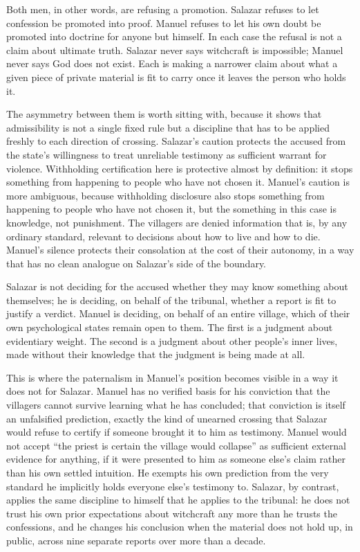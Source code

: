 \documentclass[12pt]{article}
\begin{document}
Both men, in other words, are refusing a promotion. Salazar refuses to let confession be promoted into proof. Manuel refuses to let his own doubt be promoted into doctrine for anyone but himself. In each case the refusal is not a claim about ultimate truth. Salazar never says witchcraft is impossible; Manuel never says God does not exist. Each is making a narrower claim about what a given piece of private material is fit to carry once it leaves the person who holds it.

The asymmetry between them is worth sitting with, because it shows that admissibility is not a single fixed rule but a discipline that has to be applied freshly to each direction of crossing. Salazar's caution protects the accused from the state's willingness to treat unreliable testimony as sufficient warrant for violence. Withholding certification here is protective almost by definition: it stops something from happening to people who have not chosen it. Manuel's caution is more ambiguous, because withholding disclosure also stops something from happening to people who have not chosen it, but the something in this case is knowledge, not punishment. The villagers are denied information that is, by any ordinary standard, relevant to decisions about how to live and how to die. Manuel's silence protects their consolation at the cost of their autonomy, in a way that has no clean analogue on Salazar's side of the boundary. 

Salazar is not deciding for the accused whether they may know something about themselves; he is deciding, on behalf of the tribunal, whether a report is fit to justify a verdict. Manuel is deciding, on behalf of an entire village, which of their own psychological states remain open to them. The first is a judgment about evidentiary weight. The second is a judgment about other people's inner lives, made without their knowledge that the judgment is being made at all.

This is where the paternalism in Manuel's position becomes visible in a way it does not for Salazar. Manuel has no verified basis for his conviction that the villagers cannot survive learning what he has concluded; that conviction is itself an unfalsified prediction, exactly the kind of unearned crossing that Salazar would refuse to certify if someone brought it to him as testimony. Manuel would not accept ``the priest is certain the village would collapse'' as sufficient external evidence for anything, if it were presented to him as someone else's claim rather than his own settled intuition. He exempts his own prediction from the very standard he implicitly holds everyone else's testimony to. Salazar, by contrast, applies the same discipline to himself that he applies to the tribunal: he does not trust his own prior expectations about witchcraft any more than he trusts the confessions, and he changes his conclusion when the material does not hold up, in public, across nine separate reports over more than a decade.
\end{document}

